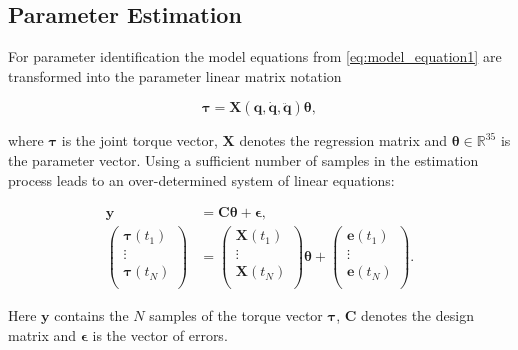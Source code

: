 \subsection{Parameter Estimation}
\label{subsec:ParameterEstimation}


For parameter identification the model equations from \eqref{eq:model_equation1} are transformed into the parameter linear matrix notation

\begin{equation} \label{eq:ParameterEstimation_regressor}
    \boldsymbol{\tau} = \boldsymbol{X}(\boldsymbol{q}, \dot{\boldsymbol{q}},\ddot{\boldsymbol{q}}) \boldsymbol{\theta},
\end{equation}

where $\boldsymbol{\tau}$ is the joint torque vector, $\boldsymbol{X}$ denotes the regression matrix and $\boldsymbol{\theta} \in \mathbb{R}^{35}$ is the parameter vector. Using a sufficient number of samples in the estimation process leads to an over-determined system of linear equations:

\begin{equation} \label{eq:ParameterEstimation_problem}
\begin{aligned}
    \boldsymbol{y} &= \boldsymbol{C} \boldsymbol{\theta} + \boldsymbol{\epsilon}, \\
    \begin{pmatrix}
        \boldsymbol{\tau}(t_1) \\
        \vdots \\
        \boldsymbol{\tau}(t_N) \\
    \end{pmatrix} &= 
    \begin{pmatrix}
        \boldsymbol{X}(t_1) \\
        \vdots \\
        \boldsymbol{X}(t_N) \\
    \end{pmatrix} \boldsymbol{\theta} +
    \begin{pmatrix}
        \boldsymbol{e}(t_1) \\
        \vdots \\
        \boldsymbol{e}(t_N) \\
    \end{pmatrix}.
\end{aligned}
\end{equation}

Here $\boldsymbol{y}$ contains the $N$ samples of the torque vector $\boldsymbol{\tau}$, $\boldsymbol{C}$ denotes the design matrix and $\boldsymbol{\epsilon}$ is the vector of errors.

